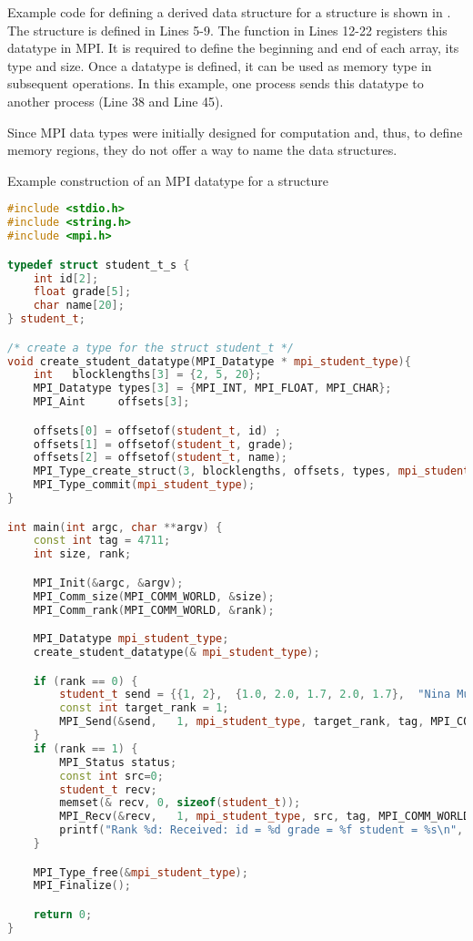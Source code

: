 Example code for defining a derived data structure for a structure is shown in .
The structure is defined in Lines 5-9.
The function in Lines 12-22 registers this datatype in MPI.
It is required to define the beginning and end of each array, its type and size.
Once a datatype is defined, it can be used as memory type in subsequent operations.
In this example, one process sends this datatype to another process (Line 38 and Line 45).

Since MPI data types were initially designed for computation and, thus, to define memory regions, they do not offer a way to name the data structures.

\begin{tcbcode}[label={lst:mpi-struct}]{Example construction of an MPI datatype for a structure}
\begin{lstlisting}[language=c++,morekeywords={{student_t}}]
#include <stdio.h>
#include <string.h>
#include <mpi.h>

typedef struct student_t_s {
    int id[2];
    float grade[5];
    char name[20];
} student_t;

/* create a type for the struct student_t */
void create_student_datatype(MPI_Datatype * mpi_student_type){
    int   blocklengths[3] = {2, 5, 20};
    MPI_Datatype types[3] = {MPI_INT, MPI_FLOAT, MPI_CHAR};
    MPI_Aint     offsets[3];

    offsets[0] = offsetof(student_t, id) ;
    offsets[1] = offsetof(student_t, grade);
    offsets[2] = offsetof(student_t, name);
    MPI_Type_create_struct(3, blocklengths, offsets, types, mpi_student_type);
    MPI_Type_commit(mpi_student_type);
}

int main(int argc, char **argv) {
    const int tag = 4711;
    int size, rank;

    MPI_Init(&argc, &argv);
    MPI_Comm_size(MPI_COMM_WORLD, &size);
    MPI_Comm_rank(MPI_COMM_WORLD, &rank);

    MPI_Datatype mpi_student_type;
    create_student_datatype(& mpi_student_type);

    if (rank == 0) {
        student_t send = {{1, 2},  {1.0, 2.0, 1.7, 2.0, 1.7},  "Nina Musterfrau"};
        const int target_rank = 1;
        MPI_Send(&send,   1, mpi_student_type, target_rank, tag, MPI_COMM_WORLD);
    }
    if (rank == 1) {
        MPI_Status status;
        const int src=0;
        student_t recv;
        memset(& recv, 0, sizeof(student_t));
        MPI_Recv(&recv,   1, mpi_student_type, src, tag, MPI_COMM_WORLD, &status);
        printf("Rank %d: Received: id = %d grade = %f student = %s\n", rank, recv.id[0], recv.grade[0], recv.name);
    }

    MPI_Type_free(&mpi_student_type);
    MPI_Finalize();

    return 0;
}
\end{lstlisting}
\end{tcbcode}



